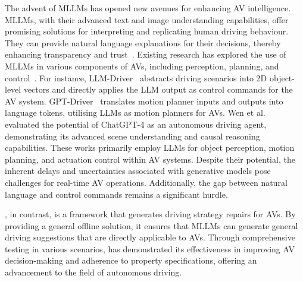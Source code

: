 The advent of MLLMs has opened new avenues for enhancing AV intelligence. MLLMs, with their advanced text and image understanding capabilities, offer promising solutions for interpreting and replicating human driving behaviour. They can provide natural language explanations for their decisions, thereby enhancing transparency and trust~\cite{cui2024survey}. Existing research has explored the use of MLLMs in various components of AVs, including perception, planning, and control~\cite{chen2023driving, mao2023gpt, wen2024road}. For instance, LLM-Driver~\cite{chen2023driving} abstracts driving scenarios into 2D object-level vectors and directly applies the LLM output as control commands for the AV system. GPT-Driver~\cite{mao2023gpt} translates motion planner inputs and outputs into language tokens, utilising LLMs as motion planners for AVs. Wen et al.~\cite{wen2024road} evaluated the potential of ChatGPT-4 as an autonomous driving agent, demonstrating its advanced scene understanding and causal reasoning capabilities. 
These works primarily employ LLMs for object perception, motion planning, and actuation control within AV systems. Despite their potential, the inherent delays and uncertainties associated with generative models pose challenges for real-time AV operations. Additionally, the gap between natural language and control commands remains a significant hurdle.


\coolname, in contrast, is a framework that generates driving strategy repairs for AVs. By providing a general offline solution, it ensures that MLLMs can generate general driving suggestions that are directly applicable to AVs. Through comprehensive testing in various scenarios, \coolname has demonstrated its effectiveness in improving AV decision-making and adherence to property specifications, offering an advancement to the field of autonomous driving.


